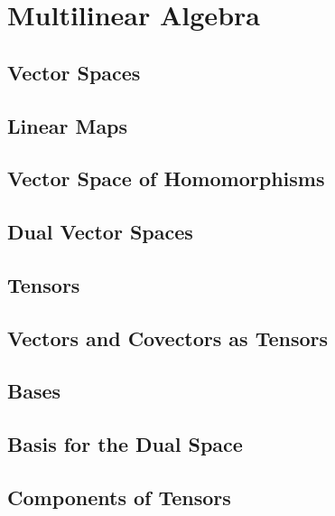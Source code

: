 \section{Multilinear Algebra}

\subsection{Vector Spaces}

\subsection{Linear Maps}

\subsection{Vector Space of Homomorphisms}

\subsection{Dual Vector Spaces}

\subsection{Tensors}

\subsection{Vectors and Covectors as Tensors}

\subsection{Bases}

\subsection{Basis for the Dual Space}

\subsection{Components of Tensors}